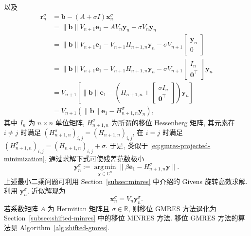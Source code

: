 {以及}
\[\begin{aligned}\bm r_n^{\sigma}&=\bm b-(A+\sigma I)\bm x_n^{\sigma}\\
&=\|\bm b\|V_{n+1}\bm e_1-AV_n\bm y_n-\sigma V_n\bm y_n\\
&=\|\bm b\|V_{n+1}\bm e_1-V_{n+1}H_{n+1,n}\bm y_n-\sigma V_{n+1}\begin{bmatrix}\bm y_n\\0\end{bmatrix}\\
&=\|\bm b\|V_{n+1}\bm e_1-V_{n+1}H_{n+1,n}\bm y_n-\sigma V_{n+1}\begin{bmatrix}I_n\\\bm0^{\top}\end{bmatrix}\bm y_n\\
&=V_{n+1}\left[\|\bm b\|\bm e_1-\left(H_{n+1,n}+\begin{bmatrix}\sigma I_n\\\bm0^{\top}\end{bmatrix}\right)\bm y_n\right]\\
&=V_{n+1}(\|\bm b\|\bm e_1-H_{n+1,n}^{\sigma}\bm y_n),\end{aligned}\]
{其中 $I_n$ 为 $n\times n$ 单位矩阵, $H_{n+1,n}^{\sigma}$ 为所谓的移位 Hessenberg 矩阵, 其元素在 $i\ne j$ 时满足 $(H_{n+1,n}^{\sigma})_{i,j}=(H_{n+1,n})_{i,j}$, 在 $i=j$ 时满足 $(H_{n+1,n}^{\sigma})_{i,j}=(H_{n+1,n})_{i,j}+\sigma$. 于是, 类似于 \eqref{eq:gmres-projected-minimization}, 通过求解下式可使残差范数极小}
\[\bm y_n^{\sigma}:=\operatorname*{arg\,min}_{\bm y\in\mathbb C^n}\|\beta\bm e_1-H_{n+1,n}^{\sigma}\bm y\|.\]
{上述最小二乘问题可利用 Section\ \ref{subsec:minres} 中介绍的 Givens 旋转高效求解. 利用 $\bm y_n^{\sigma}$, 近似解现为}
\[\bm x_n^{\sigma}=V_n\bm y_n^{\sigma}.\]
{若系数矩阵 $A$ 为 Hermitian 矩阵且 $\sigma\in\mathbb R$, 则移位 GMRES 方法退化为 Section\ \ref{subsec:shifted-minres} 中的移位 MINRES 方法. 移位 GMRES 方法的算法见 Algorithm\ \ref{alg:shifted-gmres}.}

